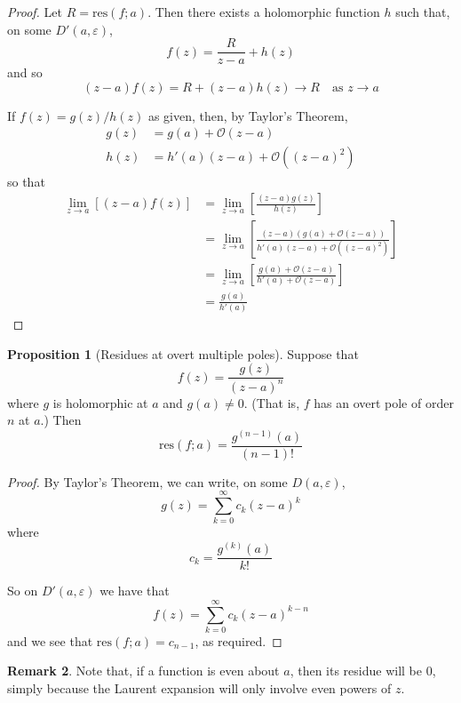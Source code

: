 \documentclass[10pt,fleqn]{article}
\newcommand{\eps}{\varepsilon}
\newcommand{\res}{\mathrm{res}}
\theoremstyle{definition} \newtheorem{defn}{Definition}[section]
\theoremstyle{plain}      \newtheorem{thm}[defn]{Theorem}
\theoremstyle{definition} \newtheorem{prop}[defn]{Proposition}
\theoremstyle{plain}      \newtheorem{lem}[defn]{Lemma}
\theoremstyle{definition} \newtheorem{cor}[defn]{Corollary}
\theoremstyle{definition} \newtheorem{ex}[defn]{Example}
\theoremstyle{definition} \newtheorem{rem}[defn]{Remark}
\begin{document}
\begin{proof}
    Let $R=\res(f;a)$.
    Then there exists a holomorphic function $h$ such that, on some $D'(a,\eps)$,
    \[
        f(z)=
        \frac{R}{z-a}+h(z)
    \]
    and so
    \[
        (z-a)f(z)=
        R+(z-a)h(z)\to R\quad\text{as }z\to a
    \]

    If $f(z)=g(z)/h(z)$ as given, then, by Taylor's Theorem,
    \begin{align*}
        g(z)
        &=
        g(a)+\mathcal{O}(z-a)\\
        h(z)
        &=
        h'(a)(z-a)+\mathcal{O}((z-a)^2)
    \end{align*}
    so that
    \begin{align*}
        \lim_{z\to a}[(z-a)f(z)]
        &=
        \lim_{z\to a}\left[\frac{(z-a)g(z)}{h(z)}\right]\\
        &=
        \lim_{z\to a}\left[\frac{(z-a)(g(a)+\mathcal{O}(z-a))}{h'(a)(z-a)+\mathcal{O}((z-a)^2)}\right]\\
        &=
        \lim_{z\to a}\left[\frac{g(a)+\mathcal{O}(z-a)}{h'(a)+\mathcal{O}(z-a)}\right]\\
        &=
        \frac{g(a)}{h'(a)}
    \end{align*}
\end{proof}

\begin{prop}[Residues at overt multiple poles]
    Suppose that
    \[
        f(z)=
        \frac{g(z)}{(z-a)^n}
    \]
    where $g$ is holomorphic at $a$ and $g(a)\neq0$.
    (That is, $f$ has an overt pole of order $n$ at $a$.)
    Then
    \begin{equation}
        \res(f;a)=
        \frac{g^{(n-1)}(a)}{(n-1)!}
    \end{equation}
\end{prop}

\begin{proof}
    By Taylor's Theorem, we can write, on some $D(a,\eps)$,
    \[
        g(z)=
        \sum_{k=0}^{\infty}c_k(z-a)^k
    \]
    where
    \[
        c_k=
        \frac{g^{(k)}(a)}{k!}
    \]

    So on $D'(a,\eps)$ we have that
    \[
        f(z)=
        \sum_{k=0}^{\infty}c_k(z-a)^{k-n}
    \]
    and we see that $\res(f;a)=c_{n-1}$, as required.
\end{proof}

\begin{rem}
    Note that, if a function is even about $a$, then its residue will be 0, simply because the Laurent expansion will only involve even powers of $z$.
\end{rem}
\end{document}
